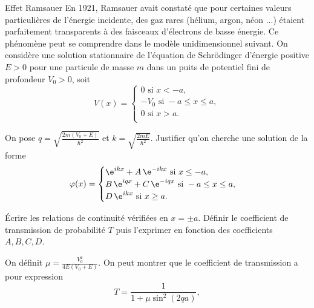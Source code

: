 \begin{exo}[PC][2][TD]{Effet Ramsauer}
En 1921, Ramsauer avait constaté que pour certaines valeurs particulières de l'énergie incidente, des gaz rares (hélium, argon, néon ...) étaient parfaitement transparents à des faisceaux d'électrons de basse énergie. Ce phénomène peut se comprendre dans le modèle unidimensionnel suivant. On considère une solution stationnaire de l'équation de Schrödinger d'énergie positive $E>0$ pour une particule de masse $m$ dans un puits de potentiel fini de profondeur $V_0>0$, soit
\begin{equation*}
V(x) =
\begin{cases}
0 \mbox{ si } x<-a, \\
-V_0 \mbox{ si } -a\leq x\leq a,\\
0 \mbox{ si } x>a. \\
\end{cases}
\end{equation*}

\begin{quest}
  \item On pose $q=\sqrt{\frac{2m(V_0+E)}{\hbar^2}}$ et $k=\sqrt{\frac{2mE}{\hbar^2}}$. Justifier qu'on cherche une solution de la forme
  \begin{equation*}
\varphi(x)=
\begin{cases}
\e^{ikx}+A\,\e^{-ikx} \mbox{ si } x\leq -a, \\
B\,\e^{iqx}+C\,\e^{-iqx}  \mbox{ si } -a\leq x\leq a,\\
D\,\e^{ikx}  \mbox{ si } x\geq a. \\
\end{cases}
\end{equation*}
\item Écrire les relations de continuité vérifiées en $x=\pm a$.
Définir le coefficient de transmission de probabilité $T$ puis l'exprimer en fonction des coefficients $A,B,C,D$.
\end{quest}
On définit $\mu = \frac{V_0^2}{4E(V_0+E)}$. 
On peut montrer que le coefficient de transmission a pour expression
$$
T = \frac{1}{1+\mu \sin^2(2qa)},
$$


\end{exo}
